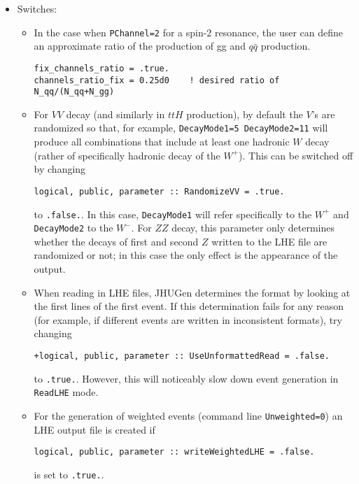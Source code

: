 \documentclass[aps,superscriptaddress,nofootinbib]{revtex4}
\begin{document}
\begin{itemize}
\item Switches:
\begin{itemize}

\item
In the case when \verb|PChannel=2| for a spin-2 resonance, the user can define an approximate ratio of the production of gg and $q\bar{q}$ production.

\begin{verbatim}
fix_channels_ratio = .true.
channels_ratio_fix = 0.25d0    ! desired ratio of N_qq/(N_qq+N_gg)
\end{verbatim}

\item
For $VV$ decay (and similarly in $ttH$ production), by default the $V$'s are randomized so that, for example, \verb|DecayMode1=5 DecayMode2=11| will produce all combinations that include at least one hadronic $W$ decay (rather of specifically hadronic decay of the $W^+$).  This can be switched off by changing
\begin{verbatim}
logical, public, parameter :: RandomizeVV = .true.
\end{verbatim}
to \verb|.false.|.  In this case, \verb|DecayMode1| will refer specifically to the $W^+$ and \verb|DecayMode2| to the $W^-$.  For $ZZ$ decay, this parameter only determines whether the decays of first and second $Z$ written to the LHE file are randomized or not; in this case the only effect is the appearance of the output.

\item
When reading in LHE files, JHUGen determines the format by looking at the first lines of the first event.  If this determination fails for any reason (for example, if different events are written in inconsistent formats), try changing
\begin{verbatim}
+logical, public, parameter :: UseUnformattedRead = .false.
\end{verbatim}
to \verb|.true.|.  However, this will noticeably slow down event generation in \verb|ReadLHE| mode.



\item
For the generation of weighted events (command line \verb|Unweighted=0|) an LHE output file is created if
\begin{verbatim}
logical, public, parameter :: writeWeightedLHE = .false.
\end{verbatim}
is set to \verb|.true.|.
\end{itemize}


\end{itemize}
\end{document}

